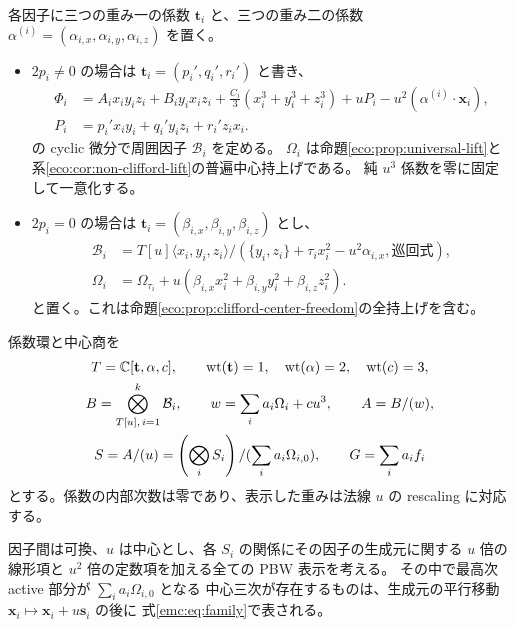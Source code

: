 各因子に三つの重み一の係数 $\mathbf t_i$ と、三つの重み二の係数
$\alpha^{(i)}=(\alpha_{i,x},\alpha_{i,y},\alpha_{i,z})$ を置く。
\begin{itemize}
\item $2p_i\ne0$ の場合は $\mathbf t_i=(p_i',q_i',r_i')$ と書き、
\[
 \begin{aligned}
 \Phi_i&=A_i x_i y_i z_i+B_i y_i x_i z_i
       +\frac{C_i}{3}(x_i^3+y_i^3+z_i^3)
       +uP_i-u^2(\alpha^{(i)}\cdot\mathbf x_i),\\
 P_i&=p_i'x_i y_i+q_i'y_i z_i+r_i'z_i x_i.
 \end{aligned}
\]
の cyclic 微分で周囲因子 $\mathcal B_i$ を定める。
$\Omega_i$ は命題\ref{eco:prop:universal-lift}と
系\ref{eco:cor:non-clifford-lift}の普遍中心持上げである。
純 $u^3$ 係数を零に固定して一意化する。
\item $2p_i=0$ の場合は $\mathbf t_i=(\beta_{i,x},\beta_{i,y},\beta_{i,z})$ とし、
\[
 \begin{aligned}
 \mathcal B_i&=T[u]\langle x_i,y_i,z_i\rangle/
 (\{y_i,z_i\}+\tau_i x_i^2-u^2\alpha_{i,x},\text{巡回式}),\\
 \Omega_i&=\Omega_{\tau_i}
        +u(\beta_{i,x}x_i^2+\beta_{i,y}y_i^2+\beta_{i,z}z_i^2).
 \end{aligned}
\]
と置く。これは命題\ref{eco:prop:clifford-center-freedom}の全持上げを含む。
\end{itemize}
係数環と中心商を
\begin{equation}\label{emc:eq:family}
 \begin{gathered}
 T=\mathbb C[\mathbf t,\alpha,c],\qquad
 \operatorname{wt}(\mathbf t)=1,\quad
 \operatorname{wt}(\alpha)=2,\quad\operatorname{wt}(c)=3,\\
 B=\bigotimes_{T[u],\,i=1}^k\mathcal B_i,\qquad
 w=\sum_i a_i\Omega_i+cu^3,\qquad A=B/(w),\\
 S=A/(u)=\left(\bigotimes_i S_i\right)/(\sum_i a_i\Omega_{i,0}),
 \qquad G=\sum_i a_i f_i
 \end{gathered}
\end{equation}
とする。係数の内部次数は零であり、表示した重みは法線 $u$ の rescaling に対応する。

\begin{proposition}
\label{emc:prop:coverage}
因子間は可換、$u$ は中心とし、各 $S_i$ の関係にその因子の生成元に関する $u$ 倍の線形項と
$u^2$ 倍の定数項を加える全ての PBW 表示を考える。
その中で最高次 active 部分が $\sum_i a_i\Omega_{i,0}$ となる
中心三次が存在するものは、生成元の平行移動
$\mathbf x_i\mapsto\mathbf x_i+u\mathbf s_i$ の後に
式\eqref{emc:eq:family}で表される。
\end{proposition}

